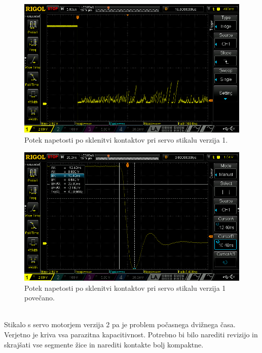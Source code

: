 \documentclass[a4paper,twoside,openright,12pt,Slovene]{book}
\begin{document}
    \begin{figure}[H]
        \centering
        \includegraphics[width=1\columnwidth]{Slike/ServoStikalo1/ServoStikalo1.png}
        \caption{\label{ServoStikalo1} Potek napetosti po sklenitvi kontaktov pri servo stikalu verzija 1.}
    \end{figure}
    
    \begin{figure}[H]
        \centering
        \includegraphics[width=1\columnwidth]{Slike/ServoStikalo1/ServoStikalo1povecano.png}
        \caption{\label{ServoStikalo1povecano} Potek napetosti po sklenitvi kontaktov pri servo stikalu verzija 1 povečano.}
    \end{figure}
    
    ~\\Stikalo s servo motorjem verzija 2 pa je problem počasnega dvižnega časa. Verjetno je kriva vsa parazitna kapacitivnost. Potrebno bi bilo narediti revizijo in skrajšati vse segmente žice in narediti kontakte bolj kompaktne. 
    
\end{document}
